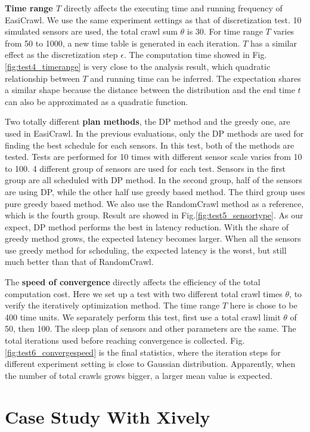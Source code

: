 \documentclass[conference]{IEEEtran}
\begin{document}
\textbf{Time range $T$} directly affects the executing time and running frequency of EasiCrawl.
We use the same experiment settings as that of discretization test. 
10 simulated sensors are used, the total crawl sum $\theta$ is 30. 
For time range $T$ varies from 50 to 1000, a new time table is generated in each iteration.
$T$ has a similar effect as the discretization step $\epsilon$. 
The computation time showed in Fig.\ref{fig:test4_timerange} is very close to the analysis result, which quadratic relationship between $T$ and running time can be inferred. 
The expectation shares a similar shape because the distance between the distribution and the end time $t$ can also be approximated as a quadratic function.

Two totally different \textbf{plan methods}, the DP method and the greedy one, are used in EasiCrawl.
In the previous evaluations, only the DP methods are used for finding the best schedule for each sensors. 
In this test, both of the methods are tested. 
Tests are performed for 10 times with different sensor scale varies from 10 to 100. 
4 different group of sensors are used for each test. 
Sensors in the first group are all scheduled with DP method.
In the second group, half of the sensors are using DP, while the other half use greedy based method. 
The third group uses pure greedy based method. 
We also use the RandomCrawl method as a reference, which is the fourth group.
Result are showed in Fig.\ref{fig:test5_sensortype}. 
As our expect, DP method performs the best in latency reduction. 
With the share of greedy method grows, the expected latency becomes larger. 
When all the sensors use greedy method for scheduling, the expected latency is the worst, but still much better than that of RandomCrawl.

The \textbf{speed of convergence} directly affects the efficiency of the total computation cost. 
Here we set up a test with two different total crawl times $\theta$, to verify the iteratively optimization method. 
The time range $T$ here is chose to be 400 time units. 
We separately perform this test, first use a total crawl limit $\theta$ of 50, then 100. 
The sleep plan of sensors and other parameters are the same. 
The total iterations used before reaching convergence is collected.
Fig.\ref{fig:test6_convergespeed} is the final statistics, where the iteration steps for different experiment setting is close to Gaussian distribution. 
Apparently, when the number of total crawls grows bigger, a larger mean value is expected.

\section{Case Study With Xively} \label{case_study}
\end{document}
